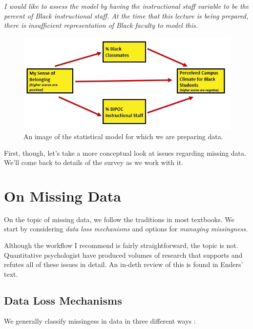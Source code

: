 \documentclass[
  11pt,
]{book}
\begin{document}
\emph{I would like to assess the model by having the instructional staff variable to be the percent of Black instructional staff. At the time that this lecture is being prepared, there is insufficient representation of Black faculty to model this.}

\begin{figure}
\centering
\includegraphics{images/Ch03/BlStuMed.jpg}
\caption{An image of the statistical model for which we are preparing data.}
\end{figure}

First, though, let's take a more conceptual look at issues regarding missing data. We'll come back to details of the survey as we work with it.

\hypertarget{on-missing-data}{%
\section{On Missing Data}\label{on-missing-data}}

On the topic of missing data, we follow the traditions in most textbooks. We start by considering \emph{data loss mechanisms} and options for \emph{managing missingness.}

Although the workflow I recommend is fairly straightforward, the topic is not. Quantitative psychologist have produced volumes of research that supports and refutes all of these issues in detail. An in-deth review of this is found in Enders' \citeyearpar{enders_applied_2010} text.

\hypertarget{data-loss-mechanisms}{%
\subsection{Data Loss Mechanisms}\label{data-loss-mechanisms}}

We generally classify missingess in data in three different ways \citep{kline_principles_2016, parent_handling_2013}:
\end{document}
